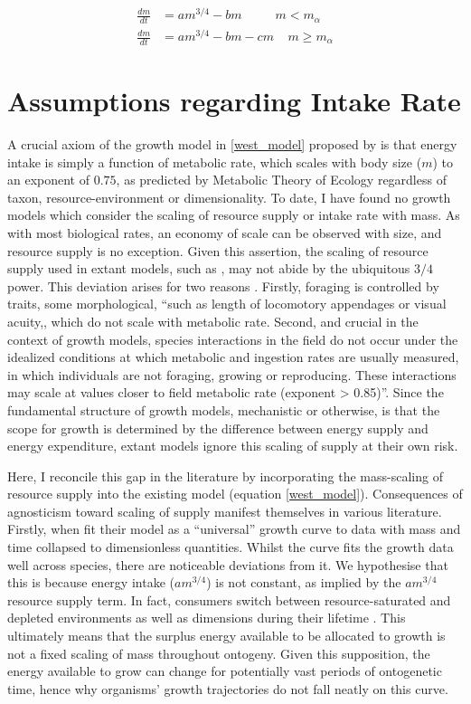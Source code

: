 \documentclass[a4paper]{article} %
\begin{document}
\begin{align*}
    \frac{dm}{dt} &= am^{3/4} - bm \ \ \ \ \ \ \ \ \ \ \ \ m < m_{\alpha} \\
    \frac{dm}{dt} &= am^{3/4} - bm - cm \ \ \ \ \ m \geq m_{\alpha}
\end{align*}

\section{Assumptions regarding Intake Rate}
A crucial axiom of the growth model in \eqref{west_model} proposed by \cite{West2001} is that energy intake is simply a function of metabolic rate, which scales with body size ($m$) to an exponent of $0.75$, as predicted by Metabolic Theory of Ecology \autocite{Brown2004} regardless of taxon, resource-environment or dimensionality. To date, I have found no growth models which consider the scaling of resource supply or intake rate with mass. As with most biological rates, an economy of scale can be observed with size, and resource supply is no exception. Given this assertion, the scaling of resource supply used in extant models, such as \cite{West2001, Charnov2001}, may not abide by the ubiquitous $3/4$ power. This deviation arises for two reasons \autocite{Pawar2012}. Firstly, foraging is controlled by traits, some morphological, ``such as length of locomotory appendages or visual acuity,, which do not scale with metabolic rate. Second, and crucial in the context of growth models, species interactions in the field do not occur under the idealized conditions at which metabolic and ingestion rates are usually measured, in which individuals are not foraging, growing or reproducing. These interactions may scale at values closer to field metabolic rate (exponent > 0.85)''. Since the fundamental structure of growth models, mechanistic or otherwise, is that the scope for growth is determined by the difference between energy supply and energy expenditure, extant models ignore this scaling of supply at their own risk.

Here, I reconcile this gap in the literature by incorporating the mass-scaling of resource supply into the existing \cite{West2001} model (equation \eqref{west_model}). Consequences of agnosticism toward scaling of supply manifest themselves in various literature. Firstly, when \cite{West2001} fit their model as a ``universal'' growth curve to data with mass and time collapsed to dimensionless quantities. Whilst the curve fits the growth data well across species, there are noticeable deviations from it. We hypothesise that this is because energy intake ($am^{3/4}$) is not constant, as implied by the $am^{3/4}$ resource supply term. In fact, consumers switch between resource-saturated and depleted environments as well as dimensions during their lifetime \autocite{Pawar2012}. This ultimately means that the surplus energy available to be allocated to growth is not a fixed scaling of mass throughout ontogeny. Given this supposition, the energy available to grow can change for potentially vast periods of ontogenetic time, hence why organisms' growth trajectories do not fall neatly on this curve.
\end{document}
